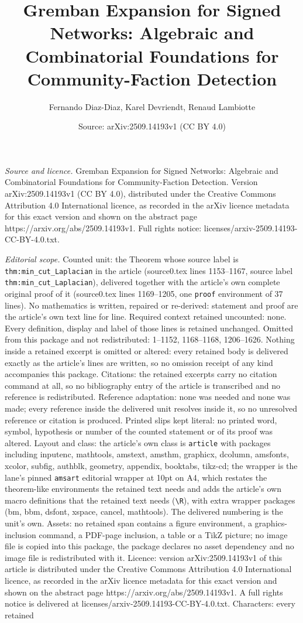 \documentclass[10pt,a4paper]{amsart}
\title[Gremban Expansion for Signed Networks: Algebraic and Combina]{Gremban Expansion for Signed Networks: Algebraic and Combinatorial Foundations for Community-Faction Detection}
\author{Fernando Diaz-Diaz, Karel Devriendt, Renaud Lambiotte}
\date{Source: arXiv:2509.14193v1 (CC BY 4.0)}
\begin{document}
\maketitle

\noindent\emph{Source and licence.} Gremban Expansion for Signed Networks: Algebraic and Combinatorial Foundations for Community-Faction Detection. Version arXiv:2509.14193v1 (CC BY 4.0), distributed under the Creative Commons Attribution 4.0 International licence, as recorded in the arXiv licence metadata for this exact version and shown on the abstract page https://arxiv.org/abs/2509.14193v1. Full rights notice: licenses/arxiv-2509.14193-CC-BY-4.0.txt.\par\smallskip

\noindent\textit{Editorial scope.} Counted unit: the Theorem whose source label is \texttt{thm:min\_cut\_Laplacian} in the article (source0.tex lines 1153--1167, source label \texttt{thm:min\_cut\_Laplacian}), delivered together with the article's own complete original proof of it (source0.tex lines 1169--1205, one \texttt{proof} environment of 37 lines). No mathematics is written, repaired or re-derived: statement and proof are the article's own text line for line. Required context retained uncounted: none. Every definition, display and label of those lines is retained unchanged. Omitted from this package and not redistributed: 1--1152, 1168--1168, 1206--1626. Nothing inside a retained excerpt is omitted or altered: every retained body is delivered exactly as the article's lines are written, so no omission receipt of any kind accompanies this package. Citations: the retained excerpts carry no citation command at all, so no bibliography entry of the article is transcribed and no reference is redistributed. Reference adaptation: none was needed and none was made; every reference inside the delivered unit resolves inside it, so no unresolved reference or citation is produced. Printed slips kept literal: no printed word, symbol, hypothesis or number of the counted statement or of its proof was altered. Layout and class: the article's own class is \texttt{article} with packages including inputenc, mathtools, amstext, amsthm, graphicx, dcolumn, amsfonts, xcolor, subfig, authblk, geometry, appendix, booktabs, tikz-cd; the wrapper is the lane's pinned \texttt{amsart} editorial wrapper at 10pt on A4, which restates the theorem-like environments the retained text needs and adds the article's own macro definitions that the retained text needs (\texttt{\textbackslash R}), with extra wrapper packages (bm, bbm, dsfont, xspace, cancel, mathtools). The delivered numbering is the unit's own. Assets: no retained span contains a figure environment, a graphics-inclusion command, a PDF-page inclusion, a table or a TikZ picture; no image file is copied into this package, the package declares no asset dependency and no image file is redistributed with it. Licence: version arXiv:2509.14193v1 of this article is distributed under the Creative Commons Attribution 4.0 International licence, as recorded in the arXiv licence metadata for this exact version and shown on the abstract page https://arxiv.org/abs/2509.14193v1. A full rights notice is delivered at licenses/arxiv-2509.14193-CC-BY-4.0.txt. Characters: every retained 
\end{document}
